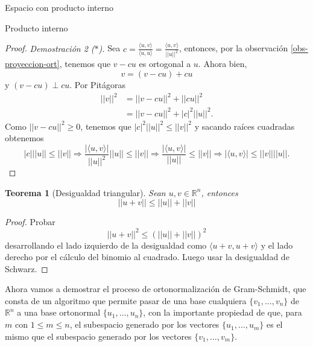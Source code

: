 \documentclass[a4paper,12pt,twoside,spanish,reqno]{amsbook}
\newtheorem{teorema}{Teorema}[section]
\theoremstyle{definition}
\theoremstyle{remark}
\newcommand{\la}{\langle}
\newcommand{\ra}{\rangle}
\newcommand{\R}{\mathbb R}
\begin{document}
\begin{chapter}{Espacio con producto interno}
\begin{section}{Producto interno}
\begin{proof}
            
        \textit{Demostración 2 ($*$).}
            Sea $c = \displaystyle\frac{\la u,v\ra}{\la u,u\ra} = \frac{\la u,v\ra}{||u||^2}$, entonces, por la observación \ref{obs-proyeccion-ort}, tenemos que  $ v-cu$ es ortogonal a $u$. Ahora bien, 
            \begin{equation*}
                v = (v - cu) + cu   
            \end{equation*}
            y  $(v - cu) \perp cu$. Por Pitágoras
            \begin{align*}
            ||v||^2 &= ||v-cu||^2 +||cu||^2  \\
            &=||v-cu||^2 +|c|^2||u||^2.
            \end{align*}
            Como $||v-cu||^2 \ge 0$, tenemos que $|c|^2||u||^2 \le 	||v||^2$ y sacando raíces cuadradas obtenemos
            $$
            |c|||u|| \le ||v|| \Rightarrow \frac{|\la u,v\ra|}{||u||^2}||u|| \le ||v|| \Rightarrow \frac{|\la u,v\ra|}{||u||}\le ||v|| \Rightarrow |\la u,v\ra|\le ||v||||u||.
            $$
        \end{proof}
        
        \begin{teorema}[Desigualdad triangular] Sean $u, v\in \R^n$, entonces 
            $$||u + v|| \le ||u|| + ||v||	$$
        \end{teorema}
        \begin{proof}
            Probar 
            $$
            ||u + v||^2 \le (||u|| + ||v||)^2
            $$
            desarrollando  el lado izquierdo de la desigualdad  como $\la u+v, u+v \ra$ y el lado derecho por el cálculo del binomio al cuadrado. Luego usar la desigualdad de Schwarz.
        \end{proof}
        
        
        \medskip
        
        Ahora vamos a demostrar el proceso de ortonormalización de Gram-Schmidt, que consta de  un algoritmo que permite pasar de una base cualquiera $\{v_1,\ldots, v_n\}$ de $\R^n$ a una base ortonormal $\{u_1,\ldots, u_n\}$, con la importante propiedad de que, para $m$ con  $1 \le m \le n$, el subespacio generado por los vectores $\{u_1,\ldots, u_m\}$ es el mismo que el subespacio generado por los vectores $\{v_1,\ldots, v_m\}$.
        
    
        
        \medskip 
        

\end{section}
\end{chapter}
\end{document}
